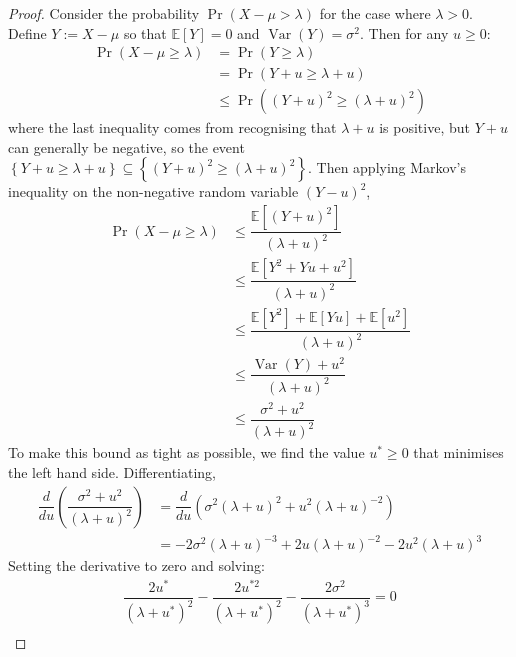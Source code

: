 \documentclass[11pt]{report} %
\begin{document}
\begin{proof}
Consider the probability $\operatorname{Pr}\left(X - \mu > \lambda\right)$ for the case where $\lambda > 0$. Define $Y := X - \mu$ so that $\mathbb{E}\left[Y\right] = 0$ and $\operatorname{Var}\left(Y\right) = \sigma^{2}$. Then for any $u \geq 0$:
\begin{align}
\operatorname{Pr}\left(X - \mu \geq \lambda\right) &= \operatorname{Pr}\left(Y \geq \lambda\right) \\
&= \operatorname{Pr}\left(Y + u \geq \lambda + u\right) \\
&\leq \operatorname{Pr}\left(\left(Y + u\right)^{2} \geq \left(\lambda + u\right)^{2}\right)
\end{align}
where the last inequality comes from recognising that $\lambda + u$ is positive, but $Y + u$ can generally be negative, so the event $\left\{Y + u \geq \lambda + u\right\} \subseteq \left\{\left(Y + u\right)^{2} \geq \left(\lambda + u\right)^{2}\right\}$. Then applying Markov's inequality on the non-negative random variable $\left(Y - u\right)^{2}$,
\begin{align}
\operatorname{Pr}\left(X - \mu \geq \lambda\right) &\leq \dfrac{\mathbb{E}\left[\left(Y + u\right)^{2}\right]}{\left(\lambda + u\right)^{2}} \\
&\leq \dfrac{\mathbb{E}\left[Y^{2} + Yu + u^{2}\right]}{\left(\lambda + u\right)^{2}} \\
&\leq \dfrac{\mathbb{E}\left[Y^{2}\right] + \mathbb{E}\left[Yu\right] + \mathbb{E}\left[u^{2}\right]}{\left(\lambda + u\right)^{2}} \\
&\leq \dfrac{\operatorname{Var}\left(Y\right) + u^{2}}{\left(\lambda + u\right)^{2}} \\
&\leq \dfrac{\sigma^{2} + u^{2}}{\left(\lambda + u\right)^{2}}
\end{align}
To make this bound as tight as possible, we find the value $u^{*} \geq 0$ that minimises the left hand side. Differentiating,
\begin{align}
\dfrac{d}{du}\left(\dfrac{\sigma^{2} + u^{2}}{\left(\lambda + u\right)^{2}}\right) &= \dfrac{d}{du}\left(\sigma^{2}\left(\lambda + u\right)^{2} + u^{2}\left(\lambda + u\right)^{-2}\right) \\
&= -2\sigma^{2}\left(\lambda + u\right)^{-3} + 2u\left(\lambda + u\right)^{-2} - 2u^{2}\left(\lambda + u\right)^{3}
\end{align}
Setting the derivative to zero and solving:
\begin{gather}
\dfrac{2u^{*}}{\left(\lambda + u^{*}\right)^{2}} - \dfrac{2u^{*2}}{\left(\lambda + u^{*}\right)^{2}} - \dfrac{2\sigma^{2}}{\left(\lambda + u^{*}\right)^{3}} = 0 \\

\end{gather}
\end{proof}
\end{document}
